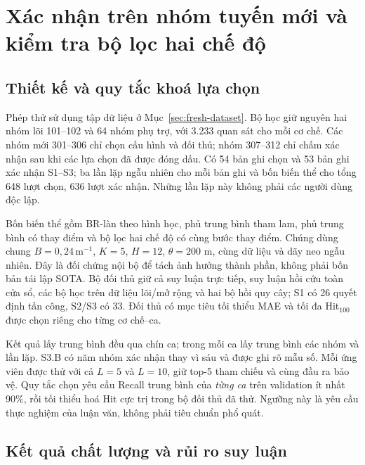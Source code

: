 \section{Xác nhận trên nhóm tuyến mới và kiểm tra bộ lọc hai chế độ}
\label{sec:fresh-switching}

\subsection{Thiết kế và quy tắc khoá lựa chọn}

Phép thử sử dụng tập dữ liệu ở Mục~\ref{sec:fresh-dataset}. Bộ học giữ nguyên hai nhóm lõi 101--102 và 64 nhóm phụ trợ, với 3.233 quan sát cho mỗi cơ chế. Các nhóm mới 301--306 chỉ chọn cấu hình và đối thủ; nhóm 307--312 chỉ chấm xác nhận sau khi các lựa chọn đã được đóng dấu. Có 54 bản ghi chọn và 53 bản ghi xác nhận S1--S3; ba lần lặp ngẫu nhiên cho mỗi bản ghi và bốn biến thể cho tổng 648 lượt chọn, 636 lượt xác nhận. Những lần lặp này không phải các người dùng độc lập.

Bốn biến thể gồm BR-làn theo hình học, phủ trung bình tham lam, phủ trung bình có thay điểm và bộ lọc hai chế độ có cùng bước thay điểm. Chúng dùng chung $B=0{,}24\,\mathrm{m}^{-1}$, $K=5$, $H=12$, $\theta=200$ m, cùng dữ liệu và dãy neo ngẫu nhiên. Đây là đối chứng nội bộ để tách ảnh hưởng thành phần, không phải bốn bản tái lập SOTA. Bộ đối thủ giữ cả suy luận trực tiếp, suy luận hồi cứu toàn cửa sổ, các bộ học trên dữ liệu lõi/mở rộng và hai bộ hồi quy cây; S1 có 26 quyết định tấn công, S2/S3 có 33. Đối thủ có mục tiêu tối thiểu MAE và tối đa Hit$_{100}$ được chọn riêng cho từng cơ chế--ca.

Kết quả lấy trung bình đều qua chín ca; trong mỗi ca lấy trung bình các nhóm và lần lặp. S3.B có năm nhóm xác nhận thay vì sáu và được ghi rõ mẫu số. Mỗi ứng viên được thử với cả $L=5$ và $L=10$, giữ top-5 tham chiếu và cùng đầu ra bảo vệ. Quy tắc chọn yêu cầu Recall trung bình của \emph{từng ca} trên validation ít nhất 90\%, rồi tối thiểu hoá Hit cực trị trong bộ đối thủ đã thử. Ngưỡng này là yêu cầu thực nghiệm của luận văn, không phải tiêu chuẩn phổ quát.

\subsection{Kết quả chất lượng và rủi ro suy luận}




